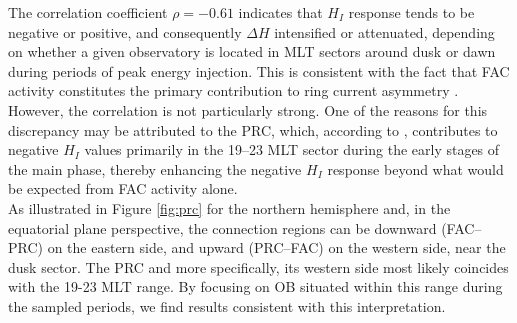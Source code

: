\documentclass[a4paper]{article}
\theoremstyle{plain}
\theoremstyle{definition}
\begin{document}
	The correlation coefficient $\rho = -0.61$ indicates that $H_I$ response tends to be negative or positive, and consequently $\Delta H$ intensified or attenuated, depending on whether a given observatory is located in MLT sectors around dusk or dawn during periods of peak energy injection. This is consistent with the fact that FAC activity constitutes the primary contribution to ring current asymmetry \citep{Fukushima1973}. However, the correlation is not particularly strong. One of the reasons for this discrepancy may be attributed to the PRC, which, according to \cite{Kamide1971, Crooker1972}, contributes to negative $H_I$ values primarily in the 19–23 MLT sector during the early stages of the main phase, thereby enhancing the negative $H_I$ response beyond what would be expected from FAC activity alone.\\ 

	As illustrated in Figure \ref{fig:prc} for the northern hemisphere and, in the equatorial plane perspective, the connection regions can be downward (FAC–PRC) on the eastern side, and upward (PRC–FAC) on the western side, near the dusk sector. The PRC and more specifically, its western side most likely coincides with the 19-23 MLT range. By focusing on OB situated within this range during the sampled periods, we find results consistent with this interpretation. \\


	
	
\end{document}
